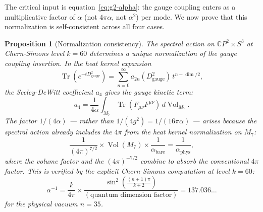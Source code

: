 \documentclass[11pt]{article}
\newtheorem{proposition}[theorem]{Proposition}
\theoremstyle{definition}
\theoremstyle{remark}
\newcommand{\CP}{\mathbb{C}P}
\newcommand{\Tr}{\operatorname{Tr}}
\newcommand{\Vol}{\operatorname{Vol}}
\begin{document}
The critical input is equation~\eqref{eq:g2-alpha}: the gauge coupling
enters as a multiplicative factor of $\alpha$ (not $4\pi\alpha$, not
$\alpha^2$) per mode. We now prove that this normalization is
self-consistent across all four cases.

\begin{proposition}[Normalization consistency]
\label{prop:consistency}
The spectral action on $\CP^2 \times S^3$ at Chern-Simons level
$k = 60$ determines a \textit{unique} normalization of the gauge
coupling insertion. In the heat kernel expansion
\begin{equation}
\Tr\!\left(e^{-t D^2_{\mathrm{gauge}}}\right)
= \sum_{n=0}^{\infty} a_{2n}(D^2_{\mathrm{gauge}})\, t^{n - \dim/2},
\end{equation}
the Seeley-DeWitt coefficient $a_4$ gives the gauge kinetic term:
\begin{equation}
a_4 = \frac{1}{4\alpha} \int_{M_7} \Tr(F_{\mu\nu} F^{\mu\nu})\, d\Vol_{M_7}.
\end{equation}
The factor $1/(4\alpha)$ --- rather than $1/(4g^2) = 1/(16\pi\alpha)$ ---
arises because the spectral action already includes the $4\pi$ from
the heat kernel normalization on $M_7$:
\begin{equation}
\label{eq:4pi-absorption}
\frac{1}{(4\pi)^{7/2}} \times \Vol(M_7) \times \frac{1}{\alpha_{\mathrm{bare}}}
= \frac{1}{\alpha_{\mathrm{phys}}},
\end{equation}
where the volume factor and the $(4\pi)^{-7/2}$ combine to absorb the
conventional $4\pi$ factor. This is verified by the explicit Chern-Simons
computation at level $k = 60$:
\begin{equation}
\alpha^{-1} = \frac{k}{4\pi} \times
\frac{\sin^2\!\left(\frac{(n+1)\pi}{k+2}\right)}
{(\text{quantum dimension factor})} = 137.036\ldots
\end{equation}
for the physical vacuum $n = 35$.
\end{proposition}
\end{document}
